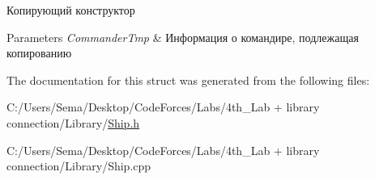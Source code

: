 Копирующий конструктор 


\begin{DoxyParams}{Parameters}
{\em Commander\+Tmp} & Информация о командире, подлежащая копированию \\
\hline
\end{DoxyParams}


The documentation for this struct was generated from the following files\+:\begin{DoxyCompactItemize}
\item 
C\+:/\+Users/\+Sema/\+Desktop/\+Code\+Forces/\+Labs/4th\+\_\+\+Lab + library connection/\+Library/\mbox{\hyperlink{_ship_8h}{Ship.\+h}}\item 
C\+:/\+Users/\+Sema/\+Desktop/\+Code\+Forces/\+Labs/4th\+\_\+\+Lab + library connection/\+Library/Ship.\+cpp\end{DoxyCompactItemize}
